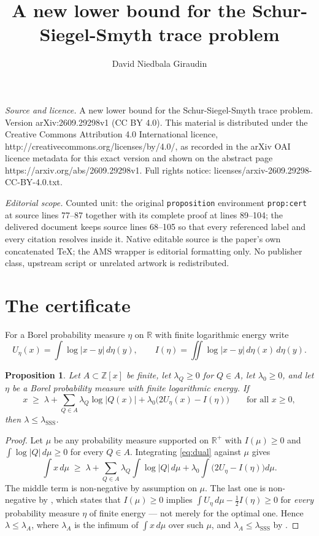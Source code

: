 \documentclass[10pt,a4paper]{amsart}
\newtheorem{proposition}[theorem]{Proposition}
\newcommand{\lsss}{\lambda_{\mathrm{SSS}}}
\begin{document}
\title[A new lower bound for the Schur-Siegel-Smyth trace problem]{A new lower bound for the Schur-Siegel-Smyth trace problem}
\author{David Niedbala Giraudin}
\date{}
\maketitle
\noindent\emph{Source and licence.} A new lower bound for the Schur-Siegel-Smyth trace problem. Version arXiv:2609.29298v1 (CC BY 4.0). This material is distributed under the Creative Commons Attribution 4.0 International licence, http://creativecommons.org/licenses/by/4.0/, as recorded in the arXiv OAI licence metadata for this exact version and shown on the abstract page https://arxiv.org/abs/2609.29298v1. Full rights notice: licenses/arxiv-2609.29298-CC-BY-4.0.txt.\par\smallskip
\noindent\textit{Editorial scope.} Counted unit: the original \texttt{proposition} environment \texttt{prop:cert} at source lines 77--87 together with its complete proof at lines 89--104; the delivered document keeps source lines 68--105 so that every referenced label and every citation resolves inside it. Native editable source is the paper's own concatenated TeX; the AMS wrapper is editorial formatting only. No publisher class, upstream script or unrelated artwork is redistributed.
\section{The certificate}\label{sec:cert}

For a Borel probability measure $\eta$ on $\mathbb{R}$ with finite logarithmic
energy write
\[
  U_\eta(x)=\int\log|x-y|\,d\eta(y),\qquad
  I(\eta)=\iint\log|x-y|\,d\eta(x)\,d\eta(y).
\]


\begin{proposition}\label{prop:cert}
Let $A\subset\mathbb{Z}[x]$ be finite, let $\lambda_Q\ge 0$ for $Q\in A$, let
$\lambda_0\ge 0$, and let $\eta$ be a Borel probability measure with finite
logarithmic energy. If
\begin{equation}\label{eq:dual}
  x \;\ge\; \lambda+\sum_{Q\in A}\lambda_Q\log|Q(x)|
            +\lambda_0\bigl(2U_\eta(x)-I(\eta)\bigr)
  \qquad\text{for all } x\ge 0,
\end{equation}
then $\lambda\le\lsss$.
\end{proposition}

\begin{proof}
Let $\mu$ be any probability measure supported on $\mathbb{R}^{+}$ with
$I(\mu)\ge 0$ and $\int\log|Q|\,d\mu\ge 0$ for every $Q\in A$. Integrating
\eqref{eq:dual} against $\mu$ gives
\[
  \int x\,d\mu \;\ge\; \lambda
  +\sum_{Q\in A}\lambda_Q\int\log|Q|\,d\mu
  +\lambda_0\int\bigl(2U_\eta-I(\eta)\bigr)d\mu .
\]
The middle term is non-negative by assumption on $\mu$. The last one is
non-negative by \cite[Lemma 2.4]{OTS}, which states that $I(\mu)\ge 0$ implies
$\int U_\eta\,d\mu-\tfrac12 I(\eta)\ge 0$ for \emph{every} probability measure
$\eta$ of finite energy --- not merely for the optimal one. Hence
$\lambda\le\lambda_A$, where $\lambda_A$ is the infimum of $\int x\,d\mu$ over
such $\mu$, and $\lambda_A\le\lsss$ by \cite[Corollary 1.2]{OTS}.
\end{proof}
\end{document}
